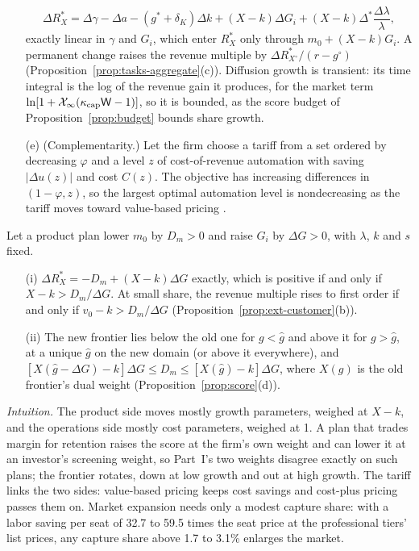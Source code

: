 \begin{proposition}
\begin{enumerate}
\begin{equation}\label{eq:prod-dR}
\Delta R_X^*=\Delta\gamma-\Delta a-(g^*+\delta_K)\Delta k+(X-k)\Delta G_i+(X-k)\Delta^*\frac{\Delta\lambda}{\lambda},
\end{equation}
exactly linear in $\gamma$ and $G_i$, which enter $R_X^*$ only through $m_0+(X-k)G_i$. A permanent change raises the revenue multiple by $\Delta R^*_{X^\circ}/(r-g^\circ)$ (Proposition~\ref{prop:tasks-aggregate}(c)). Diffusion growth is transient: its time integral is the log of the revenue gain it produces, for the market term $\ln[1+\mathcal X_\infty(\kappa_{\rm cap}\mathsf W-1)]$, so it is bounded, as the score budget of Proposition~\ref{prop:budget} bounds share growth.
\item[(e)] (Complementarity.) Let the firm choose a tariff from a set ordered by decreasing $\varphi$ and a level $z$ of cost-of-revenue automation with saving $|\Delta u(z)|$ and cost $C(z)$. The objective has increasing differences in $(1-\varphi,z)$, so the largest optimal automation level is nondecreasing as the tariff moves toward value-based pricing \citep{milgrom1994monotone}.
\end{enumerate}
\end{proposition}

\begin{corollary}\label{cor:prod-dilution}
Let a product plan lower $m_0$ by $D_m>0$ and raise $G_i$ by $\Delta G>0$, with $\lambda$, $k$ and $s$ fixed.
\begin{enumerate}
\item[(i)] $\Delta R_X^*=-D_m+(X-k)\Delta G$ exactly, which is positive if and only if $X-k>D_m/\Delta G$. At small share, the revenue multiple rises to first order if and only if $v_0-k>D_m/\Delta G$ (Proposition~\ref{prop:ext-customer}(b)).
\item[(ii)] The new frontier lies below the old one for $g<\hat g$ and above it for $g>\hat g$, at a unique $\hat g$ on the new domain (or above it everywhere), and $[X(\hat g-\Delta G)-k]\Delta G\le D_m\le[X(\hat g)-k]\Delta G$, where $X(g)$ is the old frontier's dual weight (Proposition~\ref{prop:score}(d)).
\end{enumerate}
\end{corollary}

\noindent\emph{Intuition.} The product side moves mostly growth parameters, weighed at $X-k$, and the operations side mostly cost parameters, weighed at 1. A plan that trades margin for retention raises the score at the firm's own weight and can lower it at an investor's screening weight, so Part~I's two weights disagree exactly on such plans; the frontier rotates, down at low growth and out at high growth. The tariff links the two sides: value-based pricing keeps cost savings and cost-plus pricing passes them on. Market expansion needs only a modest capture share: with a labor saving per seat of 32.7 to 59.5 times the seat price at the professional tiers' list prices, any capture share above 1.7 to 3.1\% enlarges the market.

